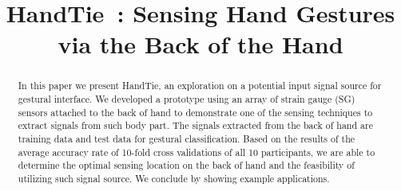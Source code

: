 \documentclass{sigchi}
\begin{document}
\newcommand{\getTitleName}{HandTie}

\title{\getTitleName\ : Sensing Hand Gestures via the Back of the Hand}


\maketitle

\begin{abstract}


In this paper we present HandTie, an exploration on a potential input signal source for gestural interface.
We developed a prototype using an array of strain gauge (SG) sensors attached to the back of hand to demonstrate one of the sensing techniques to extract signals from such body part.
The signals extracted from the back of hand are training data and test data for gestural classification. Based on the results of the average accuracy rate of 10-fold cross validations of all 10 participants, we are able to determine the optimal sensing location on the back of hand and the feasibility of utilizing such signal source.
We conclude by showing example applications.

\end{abstract}
\end{document}
